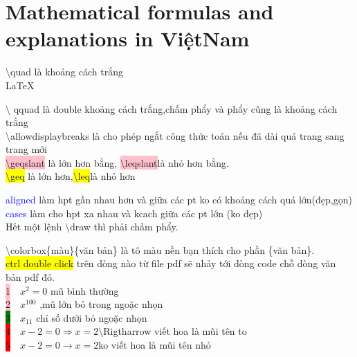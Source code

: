 \documentclass{article}
\begin{document}
\Large\section{Mathematical formulas and explanations in ViệtNam}
\large $\setminus$quad là khoảng cách trắng\\

\LaTeX\

$\setminus$ qquad là double khoảng cách trắng,chấm phẩy và phẩy cũng là khoảng cách trắng\\

$\setminus$allowdisplaybreaks là cho phép ngắt công thức toán nếu đã dài quá trang sang trang mới\\

\colorbox{pink}{$\setminus$geqslant} là lớn hơn bằng, \colorbox{pink}{$\setminus$leqslant}là nhỏ hơn bằng.\\

\colorbox{yellow}{$\setminus$geq} là lớn hơn,\colorbox{yellow}{$\setminus$leq}là nhỏ hơn

\textcolor{blue}{aligned} làm hpt gần nhau hơn và giữa các pt ko có khoảng cách quá lớn(đẹp,gọn)\\

\textcolor{blue}{cases} làm cho hpt xa nhau và kcach giữa các pt lớn (ko đẹp)\\

Hết một lệnh $\setminus$draw thì phải chấm phẩy.

$\setminus$colorbox\{màu\}\{văn bản\} là tô màu nền bạn thích cho phần \{văn bản\}.\\

\colorbox{yellow}{ctrl double click} trên dòng nào từ file pdf sẽ nhảy tới dòng code chỗ dòng văn bản pdf đó.\\

\colorbox{pink}{1}$\quad x^2=0$  \quad     mũ bình thường \\

\colorbox{pink}{2}$\quad x^{100}$ \quad ,mũ lớn bỏ trong ngoặc nhọn\\

\colorbox{green}{3}$\quad x_{11}$ \quad chỉ số dưới bỏ ngoặc nhọn\\

\colorbox{red}{4}$\quad  x-2=0 \Rightarrow x=2 $\quad  $\setminus$Rigtharrow viết hoa là mũi tên to\\

\colorbox{red}{5}$\quad x-2=0 \rightarrow x=2  $\quad  ko viết hoa là mũi tên nhỏ\\
\end{document}
